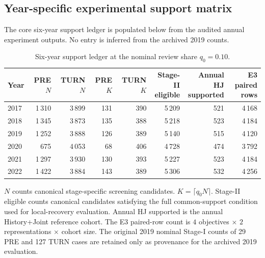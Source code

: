 \documentclass[10pt,a4paper]{article}
\numberwithin{equation}{section}
\begin{document}
\subsection{Year-specific experimental support matrix}
The core six-year support ledger is populated below from the audited annual experiment outputs. No entry is inferred from the archived 2019 counts.
\begin{table}[htbp]\centering\footnotesize
\caption{Six-year support ledger at the nominal review share $q_0=0.10$.}\label{tab:sup_sixyear_support}
\begin{tabular}{lrrrrrrr}\toprule
Year & \shortstack{PRE\\$N$} & \shortstack{TURN\\$N$} & PRE $K$ & TURN $K$ & \shortstack{Stage-II\\eligible} & \shortstack{Annual HJ\\supported} & \shortstack{E3 paired\\rows} \\ \midrule
2017 & 1\,310 & 3\,899 & 131 & 390 & 5\,209 & 521 & 4\,168 \\
2018 & 1\,345 & 3\,873 & 135 & 388 & 5\,218 & 523 & 4\,184 \\
2019 & 1\,252 & 3\,888 & 126 & 389 & 5\,140 & 515 & 4\,120 \\
2020 & 675 & 4\,053 & 68 & 406 & 4\,728 & 474 & 3\,792 \\
2021 & 1\,297 & 3\,930 & 130 & 393 & 5\,227 & 523 & 4\,184 \\
2022 & 1\,422 & 3\,884 & 143 & 389 & 5\,306 & 532 & 4\,256 \\
\bottomrule
\end{tabular}

\vspace{2pt}\parbox{.93\linewidth}{\scriptsize $N$ counts canonical stage-specific screening candidates. $K=\lceil q_0N\rceil$. Stage-II eligible counts canonical candidates satisfying the full common-support condition used for local-recovery evaluation. Annual HJ supported is the annual History+Joint reference cohort. The E3 paired-row count is $4$ objectives $\times$ $2$ representations $\times$ cohort size. The original 2019 nominal Stage-I counts of 29 PRE and 127 TURN cases are retained only as provenance for the archived 2019 evaluation.}
\end{table}
\end{document}
